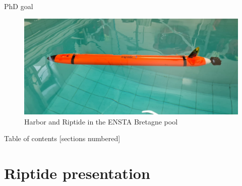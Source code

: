 \documentclass[10pt, xcolor={usenames, dvipsnames}]{beamer}
\begin{document}
\begin{frame}{PhD goal}
\begin{minipage}[c]{0.4\textwidth}
\begin{figure}[htb]
                        \vspace{.1cm}

                        \includegraphics[width=\textwidth]{imgs/Riptide.jpeg}
                        \caption{Harbor and Riptide in the ENSTA Bretagne pool}
                    \end{figure}
                \end{minipage}
            \end{frame}

    \begin{frame}{Table of contents}
        [sections numbered]
        \tableofcontents[hideallsubsections]
    \end{frame}

    \section{Riptide presentation}
\end{document}
